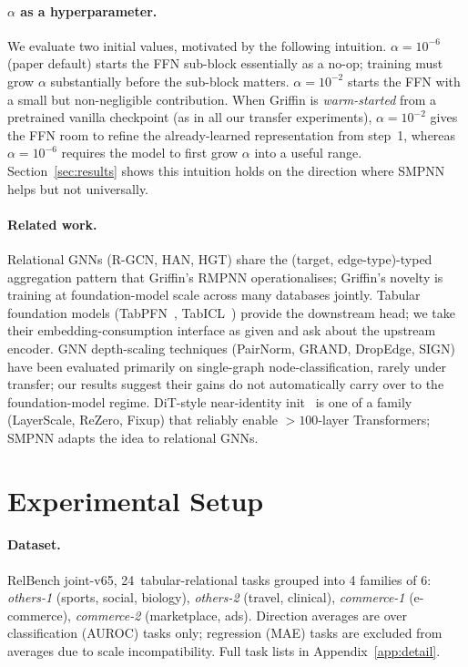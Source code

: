 \documentclass{article}
\begin{document}
\paragraph{$\alpha$ as a hyperparameter.}
We evaluate two initial values, motivated by the following intuition. $\alpha{=}10^{-6}$ (paper default) starts the FFN sub-block essentially as a no-op; training must grow $\alpha$ substantially before the sub-block matters. $\alpha{=}10^{-2}$ starts the FFN with a small but non-negligible contribution. When Griffin is \emph{warm-started} from a pretrained vanilla checkpoint (as in all our transfer experiments), $\alpha{=}10^{-2}$ gives the FFN room to refine the already-learned representation from step~1, whereas $\alpha{=}10^{-6}$ requires the model to first grow $\alpha$ into a useful range. Section~\ref{sec:results} shows this intuition holds on the direction where SMPNN helps but not universally.

\paragraph{Related work.}
Relational GNNs (R-GCN, HAN, HGT) share the (target, edge-type)-typed aggregation pattern that Griffin's RMPNN operationalises; Griffin's novelty is training at foundation-model scale across many databases jointly. Tabular foundation models (TabPFN~\citep{hollmann2024tabpfn}, TabICL~\citep{qu2024tabicl}) provide the downstream head; we take their embedding-consumption interface as given and ask about the upstream encoder. GNN depth-scaling techniques (PairNorm, GRAND, DropEdge, SIGN) have been evaluated primarily on single-graph node-classification, rarely under transfer; our results suggest their gains do not automatically carry over to the foundation-model regime. DiT-style near-identity init~\citep{peebles2023dit} is one of a family (LayerScale, ReZero, Fixup) that reliably enable ${>}100$-layer Transformers; SMPNN adapts the idea to relational GNNs.

\section{Experimental Setup}
\label{sec:setup}

\paragraph{Dataset.}
RelBench joint-v65, 24~tabular-relational tasks grouped into 4 families of 6: \emph{others-1} (sports, social, biology), \emph{others-2} (travel, clinical), \emph{commerce-1} (e-commerce), \emph{commerce-2} (marketplace, ads). Direction averages are over classification (AUROC) tasks only; regression (MAE) tasks are excluded from averages due to scale incompatibility. Full task lists in Appendix~\ref{app:detail}.
\end{document}
